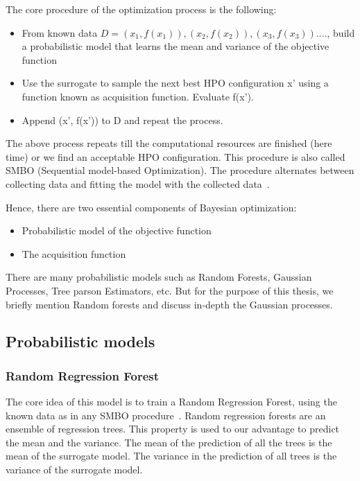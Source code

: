 \documentclass[11pt]{report}
\begin{document}
The core procedure of the optimization process is the following:
\begin{itemize}
\item From known data $D = {(x_1, f(x_1)), (x_2, f(x_2)), (x_3, f(x_3)) .... }$, build a probabilistic model that learns the mean and variance of the objective function
\item Use the surrogate to sample the next best HPO configuration x' using a function known as acquisition function. Evaluate f(x').
\item Append (x', f(x')) to D and repeat the process.
\end{itemize}

The above process repeats till the computational resources are finished (here time) or we find an acceptable HPO configuration.
This procedure is also called SMBO (Sequential model-based Optimization).
The procedure alternates between collecting data and fitting the model with the 
collected data~\cite{SMBOPaper}.

Hence, there are two essential components of Bayesian optimization:

\begin{itemize}
\item Probabilistic model of the objective function
\item The acquisition function
\end{itemize}

There are many probabilistic models such as Random Forests, Gaussian Processes, Tree parson Estimators, etc.
But for the purpose of this thesis, we briefly mention Random forests and discuss in-depth the Gaussian processes.

\subsection{Probabilistic models}
\subsubsection{Random Regression Forest}
     The core idea of this model is to train a Random Regression Forest, using the known data as in any SMBO procedure~\cite{SMBOPaper}.
Random regression forests are an ensemble of regression trees. 
This property is used to our advantage to predict the mean and the variance. 
The mean of the prediction of all the trees is the mean of the surrogate model.
The variance in the prediction of all trees is the variance of the surrogate model.
\end{document}
